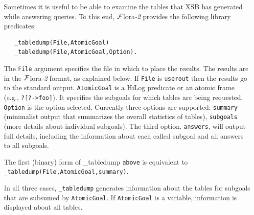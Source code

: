 \documentclass[11pt]{article}
\newcommand{\FLORA}{{\mbox{\sc ${\cal F}${lora}\rm\emph{-2}}}\xspace}
\begin{document}
Sometimes it is useful to be able to examine the tables that XSB has
generated while answering queries. To this end, \FLORA provides 
the following library predicates:
\begin{verbatim}
   _tabledump(File,AtomicGoal)
   _tabledump(File,AtomicGoal,Option).
\end{verbatim}
The \texttt{File} argument specifies the file in which to place the results.
The results are in the \FLORA format, as explained below.
If \texttt{File} is \texttt{userout} then the results go to the standard
output.  \texttt{AtomicGoal} is a HiLog predicate or an atomic frame
(e.g., \texttt{?[?->foo]}).
It specifies the subgoals for which tables are
being requested.
\texttt{Option} is the option selected. Currently three options are
supported:
\texttt{summary} (minimalist output that summarizes the overall statistics
of tables), \texttt{subgoals} (more details about individual subgoals). The
third option, \texttt{answers},
will output full details, including the information about each called subgoal
and all answers to all
subgoals.

The first (binary) form of \_tabledump \texttt{above} is equivalent to
\texttt{\_tabledump(File,AtomicGoal,summary)}. 

In all three cases, \texttt{\_tabledump} generates information
about the tables for subgoals that are subsumed by \texttt{AtomicGoal}. If
\texttt{AtomicGoal} is a variable, information is displayed about all
tables.   
\end{document}
